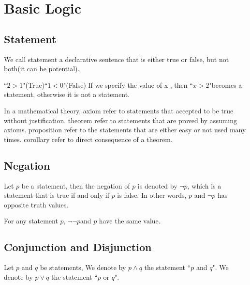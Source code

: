 \chapter{Basic Logic}
\section{Statement}
\begin{definitionenv}
    We call statement a declarative sentence that is either true or false,  but not both(it can be potential).    
\end{definitionenv}
\begin{exampleenv}
    ``$2>1$"(True)\quad ``$1<0$"(False)
    \newline
If we specify the value of x , then ``$x>2$"becomes a statement,  otherwise it is not a statement.
\end{exampleenv}
\begin{definitionenv}
    In a mathematical theory, 
    \newline 
    axiom refer to statements that accepted to be true without justification.
    \newline
    theorem refer to statements that are proved by assuming axioms.
    \newline
    proposition refer to the statements that are either easy or not used many times.
    \newline
    corollary refer to direct consequence of a theorem.
\end{definitionenv}




\section{Negation}
\begin{definitionenv}
    Let $p$ be a statement,  then the negation of $p$ is denoted by $\neg p$,  which is a statement that is true if and only if $p$ is false.
    In other words,  $p$ and $\neg p$ has opposite truth values.
\end{definitionenv}
\begin{propositionenv}
For any statement $p$,  $\neg \neg p$and $p$ have the same value.
\end{propositionenv}





\section{Conjunction and Disjunction}
\begin{definitionenv}
    Let $p$ and $q$ be statements, 
    \newline
    We denote by $p\wedge q $ the statement ``$p$ and $q$".
    \newline
    We denote by $p\vee q $ the statement ``$p$ or $q$".
    
\end{definitionenv}


